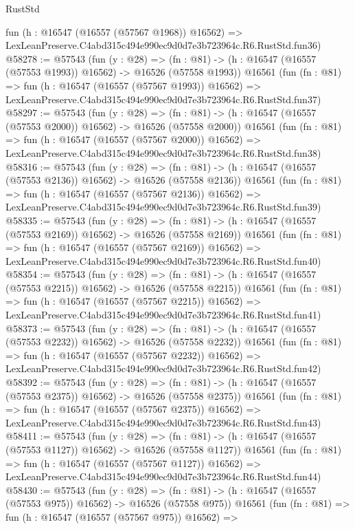 \begin{lexlean}{RustStd}
\begin{coremodule}
    fun (h : @16547 (@16557 (@57567 @1968)) @16562) =>
    LexLeanPreserve.C4abd315c494e990ec9d0d7e3b723964c.R6.RustStd.fun36)
@58278 := @57543
    (fun (y : @28) =>
    (fn : @81) -> (h : @16547 (@16557 (@57553 @1993)) @16562) -> @16526 (@57558 @1993))
    @16561
    (fun (fn : @81) =>
    fun (h : @16547 (@16557 (@57567 @1993)) @16562) =>
    LexLeanPreserve.C4abd315c494e990ec9d0d7e3b723964c.R6.RustStd.fun37)
@58297 := @57543
    (fun (y : @28) =>
    (fn : @81) -> (h : @16547 (@16557 (@57553 @2000)) @16562) -> @16526 (@57558 @2000))
    @16561
    (fun (fn : @81) =>
    fun (h : @16547 (@16557 (@57567 @2000)) @16562) =>
    LexLeanPreserve.C4abd315c494e990ec9d0d7e3b723964c.R6.RustStd.fun38)
@58316 := @57543
    (fun (y : @28) =>
    (fn : @81) -> (h : @16547 (@16557 (@57553 @2136)) @16562) -> @16526 (@57558 @2136))
    @16561
    (fun (fn : @81) =>
    fun (h : @16547 (@16557 (@57567 @2136)) @16562) =>
    LexLeanPreserve.C4abd315c494e990ec9d0d7e3b723964c.R6.RustStd.fun39)
@58335 := @57543
    (fun (y : @28) =>
    (fn : @81) -> (h : @16547 (@16557 (@57553 @2169)) @16562) -> @16526 (@57558 @2169))
    @16561
    (fun (fn : @81) =>
    fun (h : @16547 (@16557 (@57567 @2169)) @16562) =>
    LexLeanPreserve.C4abd315c494e990ec9d0d7e3b723964c.R6.RustStd.fun40)
@58354 := @57543
    (fun (y : @28) =>
    (fn : @81) -> (h : @16547 (@16557 (@57553 @2215)) @16562) -> @16526 (@57558 @2215))
    @16561
    (fun (fn : @81) =>
    fun (h : @16547 (@16557 (@57567 @2215)) @16562) =>
    LexLeanPreserve.C4abd315c494e990ec9d0d7e3b723964c.R6.RustStd.fun41)
@58373 := @57543
    (fun (y : @28) =>
    (fn : @81) -> (h : @16547 (@16557 (@57553 @2232)) @16562) -> @16526 (@57558 @2232))
    @16561
    (fun (fn : @81) =>
    fun (h : @16547 (@16557 (@57567 @2232)) @16562) =>
    LexLeanPreserve.C4abd315c494e990ec9d0d7e3b723964c.R6.RustStd.fun42)
@58392 := @57543
    (fun (y : @28) =>
    (fn : @81) -> (h : @16547 (@16557 (@57553 @2375)) @16562) -> @16526 (@57558 @2375))
    @16561
    (fun (fn : @81) =>
    fun (h : @16547 (@16557 (@57567 @2375)) @16562) =>
    LexLeanPreserve.C4abd315c494e990ec9d0d7e3b723964c.R6.RustStd.fun43)
@58411 := @57543
    (fun (y : @28) =>
    (fn : @81) -> (h : @16547 (@16557 (@57553 @1127)) @16562) -> @16526 (@57558 @1127))
    @16561
    (fun (fn : @81) =>
    fun (h : @16547 (@16557 (@57567 @1127)) @16562) =>
    LexLeanPreserve.C4abd315c494e990ec9d0d7e3b723964c.R6.RustStd.fun44)
@58430 := @57543
    (fun (y : @28) =>
    (fn : @81) -> (h : @16547 (@16557 (@57553 @975)) @16562) -> @16526 (@57558 @975))
    @16561
    (fun (fn : @81) =>
    fun (h : @16547 (@16557 (@57567 @975)) @16562) =>

\end{coremodule}
\end{lexlean}
